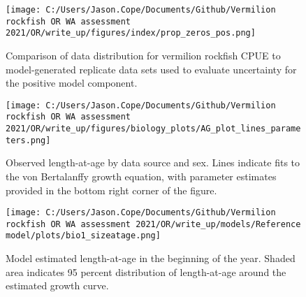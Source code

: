\documentclass[11pt,
  english,
  a4paper,
]{article}
\begin{document}
\tagmcend\tagstructend


\begin{figure}
\centering
\texttt{[image: C:/Users/Jason.Cope/Documents/Github/Vermilion rockfish OR WA assessment 2021/OR/write\_up/figures/index/prop\_zeros\_pos.png]}
\caption{Comparison of data distribution for vermilion rockfish CPUE to model-generated replicate data sets used to evaluate uncertainty for the positive model component.\label{fig:prop-zeros-pos}}
\end{figure}

\tagmcend\tagstructend


\begin{figure}
\centering
\texttt{[image: C:/Users/Jason.Cope/Documents/Github/Vermilion rockfish OR WA assessment 2021/OR/write\_up/figures/biology\_plots/AG\_plot\_lines\_parameters.png]}
\caption{Observed length-at-age by data source and sex. Lines indicate fits to the von Bertalanffy growth equation, with parameter estimates provided in the bottom right corner of the figure.\label{fig:len-age-data}}
\end{figure}

\tagmcend\tagstructend


\begin{figure}
\centering
\texttt{[image: C:/Users/Jason.Cope/Documents/Github/Vermilion rockfish OR WA assessment 2021/OR/write\_up/models/Reference model/plots/bio1\_sizeatage.png]}
\caption{Model estimated length-at-age in the beginning of the year. Shaded area indicates 95 percent distribution of length-at-age around the estimated growth curve.\label{fig:len-age-ss}}
\end{figure}
\end{document}
